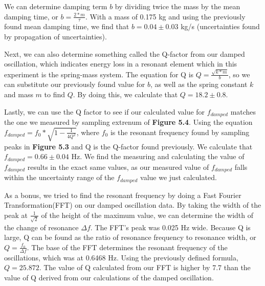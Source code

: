 \documentclass[11pt]{report}
\begin{document}
We can determine damping term \(b\) by dividing twice the mass by the mean
damping time, or \(b = \frac{2 * m}{\tau}\).  With a mass of 0.175 kg and using
the previously found mean damping time, we find that \(b = 0.04 \pm 0.03\) kg/s
(uncertainties found by propagation of uncertainties).  

Next, we can also determine something called the Q-factor from our damped
oscillation, which indicates energy loss in a resonant element which in this
experiment is the spring-mass system.  The equation for Q is 
\(Q = \frac{\sqrt{k * m}}{b}\), so we can
substitute our previously found value for \(b\), as well as the spring constant
\(k\) and mass \(m\) to find \(Q\).  By doing this, we calculate that \(Q =
18.2 \pm 0.8\).  

Lastly, we can use the Q factor to see if our calculated value for
\(f_{damped}\) matches the one we measured by sampling extrenum of
\textbf{Figure 5.4}.  Using the equation \(f_{damped} = f_0 * \sqrt{1 -
\frac{1}{4Q^2}}\), where \(f_0\) is the resonant frequency found by sampling
peaks in \textbf{Figure 5.3} and Q is the Q-factor found previously.  We
calculate that \(f_{damped} = 0.66 \pm 0.04\) Hz.  We find the measuring and
calculating the value of \(f_{damped}\) results in the exact same values, as our
measured value of \(f_{damped}\) falls within the uncertainty range of the
\(f_{damped}\) value we just calculated.

As a bonus, we tried to find the resonant frequency by doing a Fast Fourier
Transformation(FFT) on our damped oscillation data. By taking the width of the
peak at \(\frac{1}{\sqrt{2}}\) of the height of the maximum value, we can
determine the width of the change of resonance \(\Delta f\).  The FFT's peak was
0.025 Hz wide.  Because Q is large, Q can be found as the ratio of resonance
frequency to resonance width, or \(Q = \frac{f_0}{\Delta f}\). The base of the
FFT determines the resonant frequency of the oscillations, which was at 0.6468
Hz.  Using the previously defined formula, \(Q = 25.872\).  
The value of Q calculated from our FFT is higher by 7.7 than the value of Q
derived from our calculations of the damped oscillation. 
\end{document}

